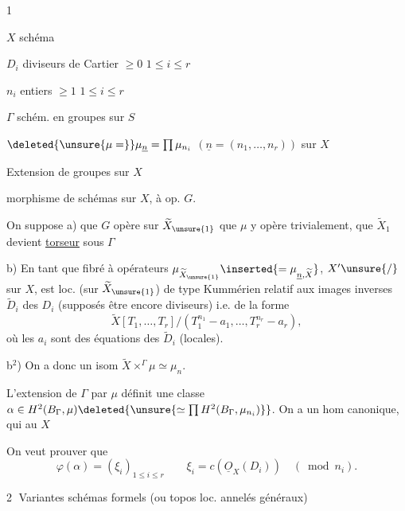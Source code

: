 \textcircled{1}

$X$ schéma

$D_i$ diviseurs de Cartier $\geq0$ \hfill $1\leq i\leq r$

$n_i$ entiers $\geq1$ \hfill $1\leq i\leq r$

$\Gamma$ schém. en groupes sur $S$

$\deleted{\unsure{\mu=}}\mu_{\underline n}=\prod\mu_{n_i}$ \quad $(\underline n=(n_1,\ldots,n_r))$ sur $X$

Extension de groupes sur $X$

morphisme de schémas sur $X$, à op. $G$.

On suppose a) que $G$ opère sur $\widetilde X_{\unsure{1}}$ que $\mu$ y opère trivialement, que  $\widetilde X_1$ devient \uline{torseur} sous $\Gamma$

b) En tant que fibré à opérateurs $\mu_{\widetilde X_{\unsure{1}}}\inserted{=\mu_{\underline n,\widetilde X}}$, $X'\unsure{/}$ sur $X$, est loc.  (sur $\widetilde X_{\unsure{1}}$) de type Kummérien relatif aux images inverses $\widetilde D_i$ des $D_i$ (supposés être encore diviseurs) i.e. de la forme
\[
\widetilde X[T_1,\ldots,T_r]/(T_1^{n_1}-a_1,\ldots,T_r^{n_r}-a_r),
\]
où les $a_i$ sont des équations des $\widetilde D_i$ (locales).

b$^2$)  On a donc un isom $\widetilde X\mathbin{\times}^{\Gamma}\mu\simeq\mu_n$.


L'extension de $\Gamma$ par $\mu$ définit une classe $\alpha\in H^2(B_\Gamma,\mu)\deleted{\unsure{\simeq\prod H^2(B_\Gamma,\mu_{n_i})}}$. On a un hom canonique, qui au $X$

On veut prouver que 
\[
\varphi(\alpha)=(\xi_i)_{1\leq i\leq r}\qquad
\xi_i=c(\underline{O}_X(D_i))\quad(\bmod n_i).
\]

\textcircled{2} Variantes schémas formels (ou topos loc. annelés généraux)
